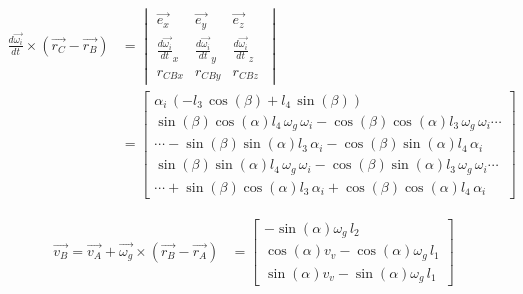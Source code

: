 \begin{equation*}
\begin{split}
\frac{d\overrightarrow{\omega_i}}{dt}\times(\overrightarrow{r_{C}}-\overrightarrow{r_{B}})
&=	\begin{vmatrix}
	\overrightarrow{e_{x}} & \overrightarrow{e_{y}} & \overrightarrow{e_{z}}\\
	\frac{d\overrightarrow{\omega_i}}{dt}_{x} & \frac{d\overrightarrow{\omega_i}}{dt}_{y} & \frac{d\overrightarrow{\omega_i}}{dt}_{z}\\
	r_{CBx} & r_{CBy} & r_{CBz}\
	\end{vmatrix}\\
&=	\begin{bmatrix}
	\alpha_{i}\, \left( -l_{3}\,\cos \left( \beta \right) +l_{4}\,\sin \left( \beta \right)  \right) \\
	\sin \left( \beta \right) \cos \left( \alpha\right) l_{4}\,\omega_{g}\,\omega_{i}-\cos \left( \beta \right) \cos\left( \alpha \right) l_{3}\,\omega_{g}\,\omega_{i}\cdots\\
	\cdots-\sin \left( \beta\right) \sin \left( \alpha \right) l_{3}\,\alpha_{i}-\cos \left( \beta \right) \sin \left( \alpha \right) l_{4}\,\alpha_{i}\\
	\sin \left( \beta \right) \sin \left( \alpha\right) l_{4}\,\omega_{g}\,\omega_{i}-\cos \left( \beta \right) \sin\left( \alpha \right) l_{3}\,\omega_{g}\,\omega_{i} \cdots\\
	\cdots +\sin \left( \beta\right) \cos \left( \alpha \right) l_{3}\,\alpha_{i}+\cos \left( \beta \right) \cos \left( \alpha \right) l_{4}\,\alpha_{i}\
	\end{bmatrix}
\end{split}
\end{equation*}

\begin{equation*}
\begin{split}
\overrightarrow{v_{B}}=\overrightarrow{v_{A}}+\overrightarrow{\omega_{g}}\times(\overrightarrow{r_{B}}-\overrightarrow{r_{A}})
&=	\begin{bmatrix}
	-\sin \left( \alpha \right) \omega_{g}\,l_{2}\\
	\cos \left( \alpha \right) v_{v}-\cos \left( \alpha \right) \omega_{g}\,l_{1}\\
	\sin \left( \alpha \right) v_{v}-\sin \left( \alpha \right) \omega_{g}\,l_{1}\
	\end{bmatrix}
\end{split}
\end{equation*}

